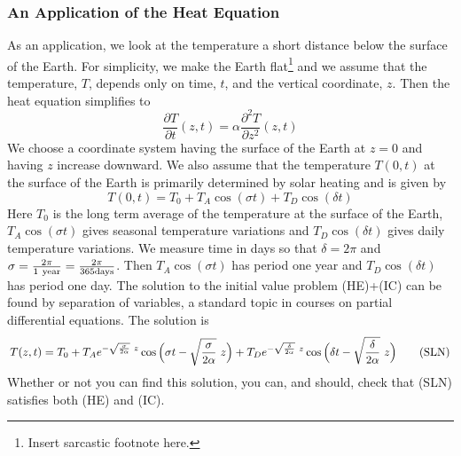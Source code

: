 \subsubsection{An Application of the Heat Equation}
As an application, we look at the temperature a short distance 
below the surface of the Earth. For simplicity, we make the Earth 
flat\footnote{Insert sarcastic footnote here.}
and we assume that the temperature, $T$, depends only on time, $t$, and 
the vertical coordinate, $z$. Then the heat equation simplifies to
\begin{equation}
\frac{\partial T}{\partial t}(z,t)
=\alpha \frac{\partial^2 T}{\partial z^2}(z,t)
\tag{HE}\end{equation}
We choose a coordinate system having the
surface of the Earth at $z=0$ and having $z$ increase downward.
We also assume that the temperature $T(0,t)$ at the surface of the Earth
is primarily determined by solar heating and is given by
\begin{equation}
T(0,t)=T_0+T_A\cos(\sigma t)+T_D\cos(\delta t)
\tag{IC}\end{equation}
Here $T_0$ is the long term
average of the temperature at the surface of the Earth, 
$T_A\cos(\sigma t)$ gives seasonal temperature variations and 
$T_D\cos(\delta t)$ gives daily temperature variations.%
We measure time in days so that 
$\delta =2\pi$ and 
$\sigma =\frac{2\pi}{1\ {\rm year}}=\frac{2\pi}{365{\rm days}}$.
Then $T_A\cos(\sigma t)$ has period one year and 
$T_D\cos(\delta t)$ has period one day.
The solution to the initial value problem (HE)+(IC) can be found by separation
of variables, a standard topic in courses on partial differential equations.
The solution is
\begin{equation}
T(z,t)=T_0
+T_Ae^{-\sqrt{\sigma \over 2\alpha}\ z}
     \cos\Big(\sigma t-\sqrt{\frac{\sigma }{2\alpha}}\ z\Big)
+T_De^{-\sqrt{\delta \over 2\alpha}\ z}
 \cos\Big(\delta t-\sqrt{\frac{\delta }{2\alpha}}\ z\Big)
\tag{SLN}\end{equation}
Whether or not you can find this solution, 
you can, and should, check that (SLN) satisfies both (HE) and (IC). 

